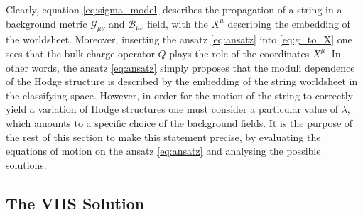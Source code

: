 \documentclass[11pt,a4paper]{article}
\numberwithin{equation}{section}
\numberwithin{table}{section}\setlength{\multlinegap}{25pt}
\begin{document}
Clearly, equation \eqref{eq:sigma_model} describes the propagation of a string in a background metric $\mathcal{G}_{\mu\nu}$ and $\mathcal{B}_{\mu\nu}$ field, with the $X^\mu$ describing the embedding of the worldsheet. Moreover, inserting the ansatz \eqref{eq:ansatz} into \eqref{eq:g_to_X} one sees that the bulk charge operator $Q$ plays the role of the coordinates $X^\mu$. In other words, the ansatz \eqref{eq:ansatz} simply proposes that the moduli dependence of the Hodge structure is described by the embedding of the string worldsheet in the classifying space. However, in order for the motion of the string to correctly yield a variation of Hodge structures one must consider a particular value of $\lambda$, which amounts to a specific choice of the background fields. It is the purpose of the rest of this section to make this statement precise, by evaluating the equations of motion on the ansatz \eqref{eq:ansatz} and analysing the possible solutions. 

\subsection{The VHS Solution}
\label{sec:VHS_solution}
\end{document}
